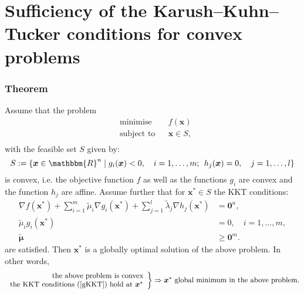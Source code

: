 \documentclass[12pt, a4paper]{article}
\begin{document}
\section{Sufficiency of the Karush–Kuhn–Tucker conditions for convex problems}
\subsubsection*{Theorem}
Assume that the problem
\begin{equation*}
\begin{aligned}
& {\text{minimise}}
& & f(\bm{x}) \\
& \text{subject to}
& & \bm{x}\in S,\\
\end{aligned}
\end{equation*}
with the feasible set $S$ given by:
\begin{equation*}
S:=\{\bm{x}\in\mathbbm{R}^n\; | \; g_i(\bm{x})<0,\quad i=1,\dots,m;\;\, h_j(\bm{x}) = 0, \quad j=1,\dots,l\}
\end{equation*}
is convex, i.e. the objective function $f$ as well as the functions $g_i$ are convex and the function $h_j$ are affine. Assume further that for $\bm{x}^*\in S$ the KKT conditions:
\begin{equation}
\label{gKKT}
\begin{split}
    \nabla f(\bm{x}^*) + \sum_{i=1}^m \tilde{\mu}_i\nabla g_i(\bm{x}^*) + \sum_{j=1}^l \tilde{\lambda}_j \nabla h_j(\bm{x}^*) &= \bm{0}^n,\\
    \tilde{\mu}_i g_i(\bm{x}^*)&=0, \quad i=1,\dots,m,\\
    \boldsymbol{\tilde{\mu}}&\geq \bm{0}^m.
\end{split}
\end{equation}
are satisfied. Then $\bm{x}^*$ is a globally optimal solution of the above problem.
In other words,
\begin{equation*}
\left.\begin{array}{r}

  \text{the above problem is convex} \\
  \text{the KKT conditions (\ref{gKKT}) hold at $\bm{x}^*$}

\end{array}\right\} \Rightarrow \bm{x}^* \text{ global minimum in the above problem}.
\end{equation*}
\end{document}
